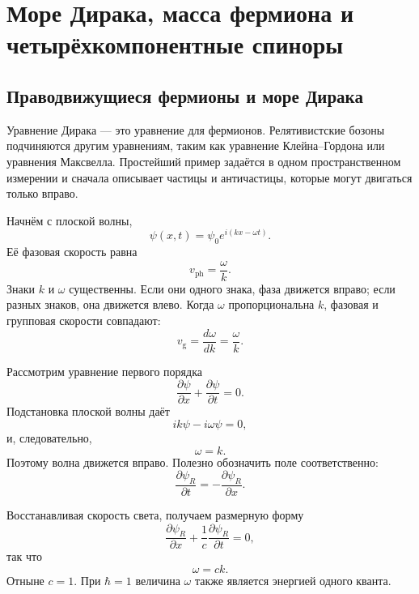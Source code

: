 \chapter{Море Дирака, масса фермиона и четырёхкомпонентные спиноры}

\section{Праводвижущиеся фермионы и море Дирака}

Уравнение Дирака — это уравнение для фермионов. Релятивистские бозоны подчиняются другим уравнениям, таким как уравнение Клейна--Гордона или уравнения Максвелла. Простейший пример задаётся в одном пространственном измерении и сначала описывает частицы и античастицы, которые могут двигаться только вправо.

Начнём с плоской волны,
\begin{equation}
\psi(x,t)=\psi_0 e^{i(kx-\omega t)}.
\end{equation}
Её фазовая скорость равна
\begin{equation}
v_{\mathrm{ph}}=\frac{\omega}{k}.
\end{equation}
Знаки \(k\) и \(\omega\) существенны. Если они одного знака, фаза движется вправо; если разных знаков, она движется влево. Когда \(\omega\) пропорциональна \(k\), фазовая и групповая скорости совпадают:
\begin{equation}
v_{\mathrm{g}}=\frac{d\omega}{dk}=\frac{\omega}{k}.
\end{equation}

Рассмотрим уравнение первого порядка
\begin{equation}
\frac{\partial\psi}{\partial x}
+
\frac{\partial\psi}{\partial t}
=0.
\end{equation}
Подстановка плоской волны даёт
\begin{equation}
ik\psi-i\omega\psi=0,
\end{equation}
и, следовательно,
\begin{equation}
\omega=k.
\end{equation}
Поэтому волна движется вправо. Полезно обозначить поле соответственно:
\begin{equation}
\frac{\partial\psi_R}{\partial t}
=
-\frac{\partial\psi_R}{\partial x}.
\end{equation}

Восстанавливая скорость света, получаем размерную форму
\begin{equation}
\frac{\partial\psi_R}{\partial x}
+
\frac{1}{c}\frac{\partial\psi_R}{\partial t}
=0,
\end{equation}
так что
\begin{equation}
\omega=ck.
\end{equation}
Отныне \(c=1\). При \(\hbar=1\) величина \(\omega\) также является энергией одного кванта.

